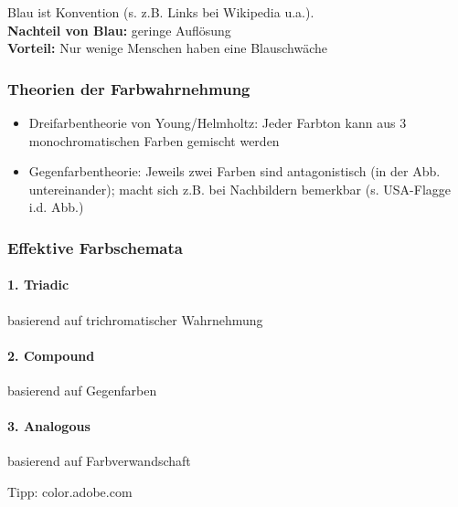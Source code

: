 			Blau ist Konvention (s. z.B. Links bei Wikipedia u.a.).\\
			\textbf{Nachteil von Blau: } geringe Auflösung\\
			\textbf{Vorteil: } Nur wenige Menschen haben eine Blauschwäche\\
			
		\subsubsection{Theorien der Farbwahrnehmung}
			\begin{itemize}
				\item Dreifarbentheorie von Young/Helmholtz: Jeder Farbton kann aus 3
				monochromatischen Farben gemischt werden
					
				\item Gegenfarbentheorie: Jeweils zwei Farben sind antagonistisch (in der Abb. untereinander); macht sich z.B. bei Nachbildern bemerkbar (s. USA-Flagge i.d. Abb.)
			\end{itemize}
		
		\pagebreak
	
		\subsubsection{Effektive Farbschemata}
			\paragraph{1. Triadic} basierend auf trichromatischer Wahrnehmung
			
			\paragraph{2. Compound} basierend auf Gegenfarben	
				
			\paragraph{3. Analogous} basierend auf Farbverwandschaft
				
			Tipp: color.adobe.com
				
		\pagebreak
			
